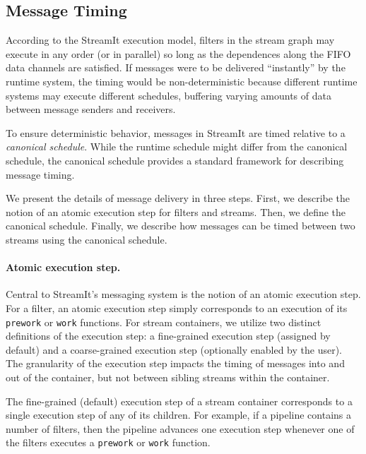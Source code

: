 \subsection{Message Timing}
\label{sec:message-timing}

According to the StreamIt execution model, filters in the stream graph
may execute in any order (or in parallel) so long as the dependences
along the FIFO data channels are satisfied.  If messages were to be
delivered ``instantly'' by the runtime system, the timing would be
non-deterministic because different runtime systems may execute
different schedules, buffering varying amounts of data between message
senders and receivers.  

To ensure deterministic behavior, messages in StreamIt are timed
relative to a {\it canonical schedule}.  While the runtime schedule
might differ from the canonical schedule, the canonical schedule
provides a standard framework for describing message timing.

We present the details of message delivery in three steps.  First, we
describe the notion of an atomic execution step for filters and
streams.  Then, we define the canonical schedule.  Finally, we
describe how messages can be timed between two streams using the
canonical schedule.

\paragraph{Atomic execution step.}

Central to StreamIt's messaging system is the notion of an atomic
execution step.  For a filter, an atomic execution step simply
corresponds to an execution of its {\tt prework} or {\tt work}
functions.  For stream containers, we utilize two distinct definitions
of the execution step: a fine-grained execution step (assigned by
default) and a coarse-grained execution step (optionally enabled by
the user).  The granularity of the execution step impacts the timing
of messages into and out of the container, but not between sibling
streams within the container.

The fine-grained (default) execution step of a stream container
corresponds to a single execution step of any of its children.  For
example, if a pipeline contains a number of filters, then the pipeline
advances one execution step whenever one of the filters executes a
{\tt prework} or {\tt work} function.

